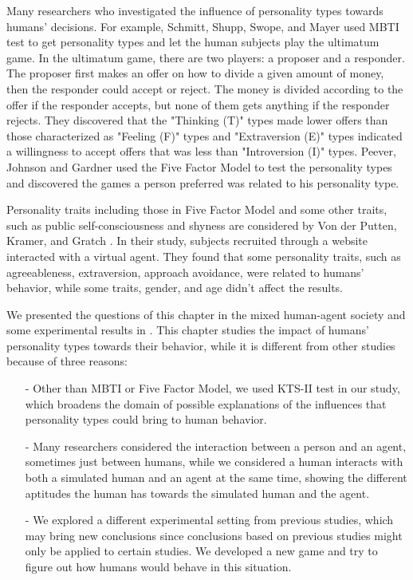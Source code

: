 Many researchers who investigated the influence of personality types towards humans' decisions. For example, Schmitt, Shupp, Swope, and Mayer \cite{Schmitt2008} used MBTI test to get personality types and let the human subjects play the ultimatum game. In the ultimatum game, there are two players: a proposer and a responder. The proposer first makes an offer on how to divide a given amount of money, then the responder could accept or reject. The money is divided according to the offer if the responder accepts, but none of them gets anything if the responder rejects. They discovered that the "Thinking (T)" types made lower offers than those characterized as "Feeling (F)" types and "Extraversion (E)" types indicated a willingness to accept offers that was less than "Introversion (I)" types. Peever, Johnson and Gardner \cite{Peever2012} used the Five Factor Model to test the personality types and discovered the games a person preferred was related to his personality type.

Personality traits including those in Five Factor Model \cite{digman1990} and some other traits, such as public self-consciousness and shyness are considered by Von der Putten, Kramer, and Gratch \cite{vonderputten2010}. In their study, subjects recruited through a website interacted with a virtual agent. They found that some personality traits, such as agreeableness, extraversion, approach avoidance, were related to humans' behavior, while some traits, gender, and age didn't affect the results.

We presented the questions of this chapter in the mixed human-agent society and some experimental results in \cite{du2013} \cite{du2013iat}. This chapter studies the impact of humans' personality types towards their behavior, while it is different from other studies because of three reasons: 
\begin{itemize}
\item[-]Other than MBTI or Five Factor Model, we used KTS-II test in our study, which broadens the domain of possible explanations of the influences that personality types could bring to human behavior.
\item[-]Many researchers considered the interaction between a person and an agent, sometimes just between humans, while we considered a human interacts with both a simulated human and an agent at the same time, showing the different aptitudes the human has towards the simulated human and the agent.
\item[-]We explored a different experimental setting from previous studies, which may bring new conclusions since conclusions based on previous studies might only be applied to certain studies. We developed a new game and try to figure out how humans would behave in this situation.
\end{itemize}
           


